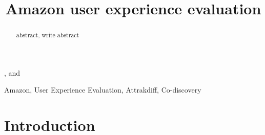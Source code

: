 \documentclass[fleqn]{IOS-Book-Article}
\begin{document}


\newpage


\newpage


\newpage

%

\pagestyle{plain}
\setcounter{page}{1}

\begin{frontmatter}    

\title{Amazon user experience evaluation}

\author{ }, %
and
\author{ }

\address{Department of Computer Science, Aalborg University, Denmark}





\begin{abstract} 
abstract, write abstract
\end{abstract}

\begin{keyword}
Amazon, User Experience Evaluation, Attrakdiff, Co-discovery
\end{keyword}
\end{frontmatter}



\section{Introduction} \label{sec:introduction}

\end{document}
